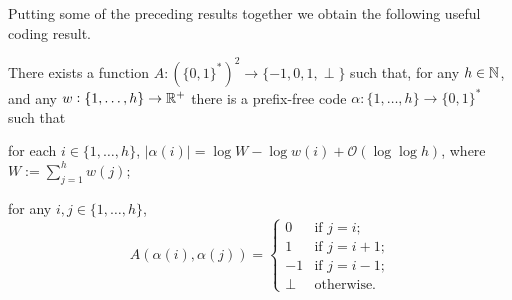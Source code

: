 \documentclass[10pt, conference, compsocconf]{IEEEtran}
\newcommand{\Oh}{\mathcal{O}}
\let\le\leqslant
\begin{document}
Putting some of the preceding results together we obtain the following useful coding result.

\begin{lem}
  There exists a function $A:(\{0,1\}^*)^2\to\{-1,0,1,\perp\}$ such that, for any $h\in\mathbb{N}$, and any $w:\{1,\dots,h\}\to\mathbb{R}^+$ there is a prefix-free code $\alpha:\{1,\dots,h\}\to \{0,1\}^*$ such that
  \begin{compactenum}
    \item for each $i\in\{1,\dots,h\}$, $|\alpha(i)|=\log W -\log w(i) + \Oh(\log\log h)$, where $W:=\sum_{j=1}^h w(j)$;
    \item for any $i,j\in\{1,\dots,h\}$,
    \[   A(\alpha(i),\alpha(j))
    = \begin{cases}
       0 & \text{if $j=i$;}\\
       1 & \text{if $j=i+1$;} \\
       -1 & \text{if $j=i-1$;} \\
       \perp & \text{otherwise.}
      \end{cases}
      \]
    \end{compactenum}
\end{lem}



\end{document}
